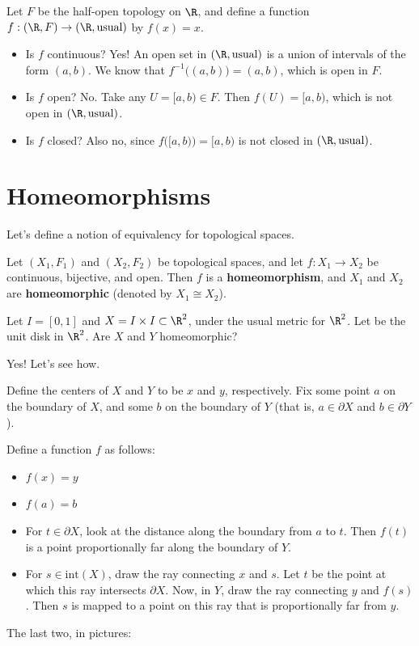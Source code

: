\begin{example}
Let $F$ be the half-open topology on $\R$, and define a function $\nobreak{f:(\R,F)\to(\R,\text{usual})}$ by $f(x) = x$.
\end{example}
\begin{itemize}
\item Is $f$ continuous?  Yes!  An open set in $(\R, \text{usual})$ is a union of intervals of the form $(a,b)$.  We know that $f^{-1}\big((a,b)\big) = (a,b)$, which is open in $F$.
\item Is $f$ open?  No.  Take any $U = [a,b) \in F$.  Then $f(U) = [a,b)$, which is not open in $(\R, \text{usual})$.
\item Is $f$ closed? Also no, since $f\big([a,b)\big) = [a,b)$ is not closed in $(\R, \text{usual})$.
\end{itemize}

\section{Homeomorphisms}
Let's define a notion of equivalency for topological spaces.

\begin{definition}
Let $(X_1,F_1)$ and $(X_2,F_2)$ be topological spaces, and let $f:X_1\to X_2$ be continuous, bijective, and open.  Then $f$ is a {\bf homeomorphism}, and $X_1$ and $X_2$ are {\bf homeomorphic} (denoted by $X_1 \cong X_2$).
\end{definition}

\begin{example}
Let $I = [0,1]$ and $X = I\times I\subset\R^2$, under the usual metric for $\R^2$.  Let  be the unit disk in $\R^2$.  Are $X$ and $Y$ homeomorphic?
\begin{center}
\placeholder \placeholder
\end{center}
\end{example}
Yes!  Let's see how. 

Define the centers of $X$ and $Y$ to be $x$ and $y$, respectively.  Fix some point $a$ on the boundary of $X$, and some $b$ on the boundary of $Y$ (that is, $a\in \partial X$ and $b\in\partial Y$).

Define a function $f$ as follows:
\begin{itemize}
\item $f(x) = y$
\item $f(a) = b$
\item For $t\in\partial X$, look at the distance along the boundary from $a$ to $t$.  Then $f(t)$ is a point proportionally far along the boundary of $Y$.
\item For $s\in \text{int}(X)$, draw the ray connecting $x$ and $s$.  Let $t$ be the point at which this ray intersects $\partial X$.  Now, in $Y$, draw the ray connecting $y$ and $f(s)$.  Then $s$ is mapped to a point on this ray that is proportionally far from $y$.
\end{itemize}
The last two, in pictures:
\placeholder\placeholder

